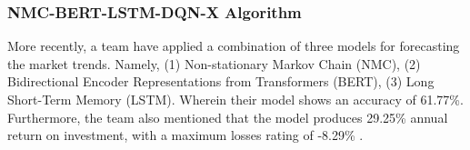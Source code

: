 \subsubsection{NMC-BERT-LSTM-DQN-X Algorithm}
\label{subsubsec:nmc_bert_lstm_dqn_x}
More recently, a team have applied a combination of three models for 
forecasting the market trends. Namely, (1) Non-stationary Markov Chain (NMC), 
(2) Bidirectional Encoder Representations from Transformers (BERT), 
(3) Long Short-Term Memory (LSTM). Wherein their model shows an accuracy of 61.77\%. 
Furthermore, the team also mentioned that the model produces 29.25\% 
annual return on investment, with a maximum losses rating of -8.29\% 
\cite{Liu2022}.